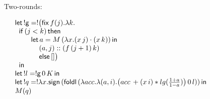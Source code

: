 \documentclass{article}
\begin{document}
\begin{figure}

Two-rounds:

\[
\begin{array}{l}
 \mathsf{let}\, !\mathsf{g} = ! \big( \mathsf{fix} \, f(j). \lambda k.  \\
 \hspace{.2cm} \mathsf{if}\, (j < k) \, \mathsf{then} \\
  \hspace{.8cm} \mathsf{let} \, a = M \, ( \lambda x. (x \,j)\cdot (x \,k) )  \, \mathsf{in} \\
  \hspace{1.2cm} (a, j) :: (f  \,(j+1) \, k) \\
 \hspace{1.2cm} \mathsf{else} \, [] \big) \\
  \hspace{.2cm} \mathsf{in} \\
  \mathsf{let}\, !l = !\mathsf{g} \, 0\, K \, \mathsf{in} \\
  \mathsf{let} \, ! q = ! \lambda x. \mathsf{sign} \, (\mathsf{foldl} \, (\lambda acc. \lambda (a,i). \big(acc\,+ (x \, i) *lg(\frac{1+a}{1-a})  \big) \, 0 \, l )) \, \mathsf{in} \\
  M ( q )
\end{array}
\]


\end{figure}
\end{document}
